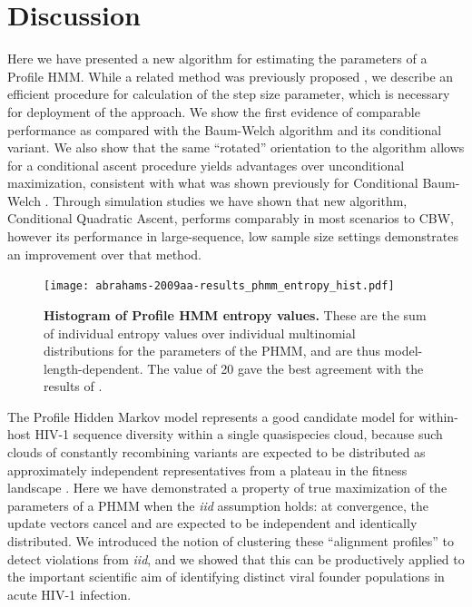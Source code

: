 \documentclass[preprint,12pt,authoryear]{elsarticle}
\begin{document}
\section{Discussion}
Here we have presented a new algorithm for estimating the parameters of a Profile HMM. While a related method was previously proposed \citep{baldi1994smooth}, we describe an efficient procedure for calculation of the step size parameter, which is necessary for deployment of the approach. We show the first evidence of comparable performance as compared with the Baum-Welch algorithm and its conditional variant.  We also show that the same ``rotated'' orientation to the algorithm allows for a conditional ascent procedure yields advantages over unconditional maximization, consistent with what was shown previously for Conditional Baum-Welch \citep{edlefsen2010transposon}.  Through simulation studies we have shown that new algorithm, Conditional Quadratic Ascent, performs comparably in most scenarios to CBW, however its performance in large-sequence, low sample size settings demonstrates an improvement over that method.

\begin{figure}
\centering
\texttt{[image: abrahams-2009aa-results\_phmm\_entropy\_hist.pdf]}
\caption{\textbf{Histogram of Profile HMM entropy values.} These are the sum of individual entropy values over individual multinomial distributions for the parameters of the PHMM, and are thus model-length-dependent.  The value of 20 gave the best agreement with the results of \cite{Abrahams:2009aa}.}
\label{fig:PHMM_entropy_hist}
\end{figure}

The Profile Hidden Markov model represents a good candidate model for within-host HIV-1 sequence diversity within a single quasispecies cloud, because such clouds of constantly recombining variants are expected to be distributed as approximately independent representatives from a plateau in the fitness landscape \citep{Domingo01012002,vignuzzi2006quasispecies}.  Here we have demonstrated a property of true maximization of the parameters of a PHMM when the \textit{iid} assumption holds: at convergence, the update vectors cancel and are expected to be independent and identically distributed.  We introduced the notion of clustering these ``alignment profiles'' to detect violations from \textit{iid}, and we showed that this can be productively applied to the important scientific aim of identifying distinct viral founder populations in acute HIV-1 infection.
\end{document}
